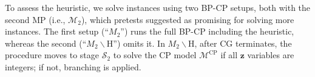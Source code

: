 \documentclass[12pt]{article}
\begin{document}

To assess the heuristic, we solve instances using two BP-CP setups, both with the second MP (i.e., $\mathcal{M}_2$), which pretests suggested as promising for solving more instances. The first setup (``$M_2$'') runs the full BP-CP including the heuristic, whereas the second (``$M_2\backslash$H'') omits it. In $M_2\backslash$H, after CG terminates, the procedure moves to stage $\mathcal{S}_2$ to solve the CP model $\mathcal{M}^{\text{CP}}$ if all $\boldsymbol{z}$ variables are integers; if not, branching is applied.
\end{document}
